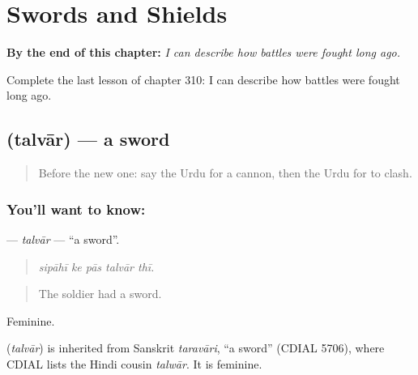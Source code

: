 
\chapter{Swords and Shields}
\label{ch:ur-swords-and-shields}

\begin{chapteropening}
\textbf{By the end of this chapter:} \emph{I can describe how battles were fought long ago.}

Complete the last lesson of chapter 310: I can describe how battles were fought long ago.
\end{chapteropening}

\section[\texorpdfstring{\ur{تلوار} (talvār)}{تلوار (talvār)}]{ (talvār) — a sword}

\label{lesson:UR-C310-talvar}



\begin{quote}
Before the new one: say the Urdu for a cannon, then the Urdu for to clash.
\end{quote}

\subsection*{You'll want to know: }
\textbf{} — \emph{talvār} — \textquotedblleft{}a sword\textquotedblright{}.

\begin{quote}
    
\end{quote}

\begin{quote}
\emph{sipāhī ke pās talvār thī.}
\end{quote}

\begin{quote}
The soldier had a sword.
\end{quote}

Feminine.

\begin{cousinweb}
\textbf{} (\emph{talvār}) is inherited from Sanskrit \emph{taravāri}, \textquotedblleft{}a sword\textquotedblright{} (CDIAL 5706), where CDIAL lists the Hindi cousin \emph{talwār}. It is feminine.
\end{cousinweb}


